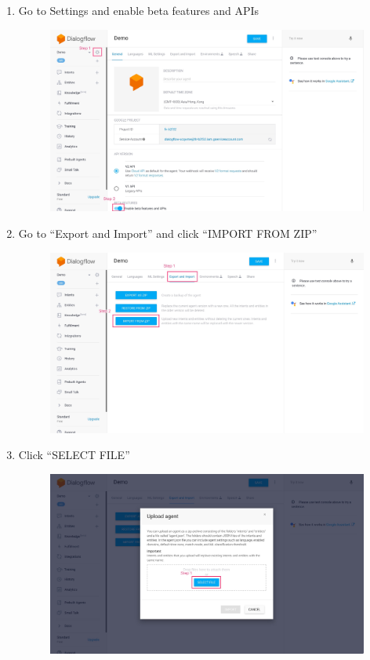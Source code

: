 \begin{enumerate}
	\item Go to Settings and enable beta features and APIs
	\nopagebreak
	\begin{figure}[H]
		\centering
		\includegraphics[width=\linewidth, frame]{img/manual_3.jpg}
	\end{figure}

	\item Go to “Export and Import” and click “IMPORT FROM ZIP”

	\begin{figure}[H]
		\centering
		\includegraphics[width=\linewidth, frame]{img/manual_4.jpg}
	\end{figure}

	\item Click “SELECT FILE”
	\nopagebreak
	\begin{figure}[H]
		\centering
		\includegraphics[width=\linewidth, frame]{img/manual_5.jpg}
	\end{figure}


\end{enumerate}
